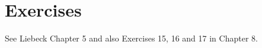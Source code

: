 \documentclass[11pt,dvipsnames]{book}
\numberwithin{equation}{section} %
\numberwithin{figure}{section} %
\numberwithin{table}{section} %
\begin{document}
%
%
%
%
%



\section{Exercises}

See Liebeck Chapter 5 and also Exercises 15, 16 and 17 in Chapter 8. 

\end{document}

